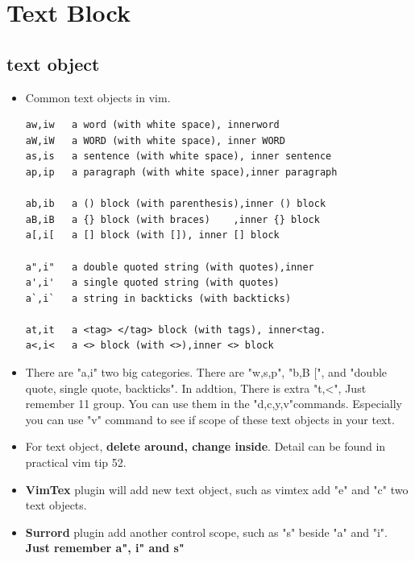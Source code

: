 \documentclass[a4paper,11pt,twoside]{book}
\begin{document}
\section{Text Block}

\subsection{text object}
\begin{itemize}
		\item Common text objects in vim. 
\begin{verbatim}
aw,iw	a word (with white space), innerword		
aW,iW	a WORD (with white space), inner WORD		
as,is	a sentence (with white space), inner sentence
ap,ip	a paragraph (with white space),inner paragraph
	
ab,ib	a () block (with parenthesis),inner () block
aB,iB	a {} block (with braces)	,inner {} block
a[,i[	a [] block (with []), inner [] block

a",i"	a double quoted string (with quotes),inner
a',i'	a single quoted string (with quotes)
a`,i`	a string in backticks (with backticks)

at,it	a <tag> </tag> block (with tags), inner<tag.
a<,i<	a <> block (with <>),inner <> block
\end{verbatim}

		\item There are "a,i" two big categories. There are "w,s,p", "b,B $[$", and "double quote, single quote, backticks". In addtion, There is extra "t,<", Just remember 11 group. You can use them in the "d,c,y,v"commands. Especially you can use "v" command to see if scope of these text objects in your text.  

		\item For text object,  \textbf{delete around, change inside}. Detail can be found in practical vim tip 52. 

		\item \textbf{VimTex} plugin will add new text object, such as vimtex add "e" and "c" two text objects. 

		\item \textbf{Surrord} plugin add another control scope, such as "s" beside "a" and "i".  \textbf{Just remember a", i" and s"}
\end{itemize}
\end{document}
